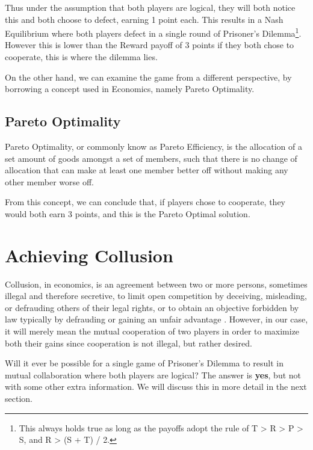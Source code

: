 \documentclass{icldt}
\numberwithin{equation}{section}       %
\begin{document}
Thus under the assumption that both players are logical, they will both notice this and both choose to defect, earning 1 point each. This results in a Nash Equilibrium where both players defect in a single round of Prisoner's Dilemma\footnote{This always holds true as long as the payoffs adopt the rule of T > R > P > S, and R > (S + T) / 2.}. However this is lower than the Reward payoff of 3 points if they both chose to cooperate, this is where the dilemma lies. \cite{nash94}

On the other hand, we can examine the game from a different perspective, by borrowing a concept used in Economics, namely Pareto Optimality.

\subsection{Pareto Optimality}
Pareto Optimality, or commonly know as Pareto Efficiency, is the allocation of a set amount of goods amongst a set of members, such that there is no change of allocation that can make at least one member better off without making any other member worse off. \cite{fudenberg1993game}

From this concept, we can conclude that, if players chose to cooperate, they would both earn 3 points, and this is the Pareto Optimal solution. 
\section{Achieving Collusion} 
\label{sect:Achieving Collusion}
Collusion, in economics, is an agreement between two or more persons, sometimes illegal and therefore secretive, to limit open competition by deceiving, misleading, or defrauding others of their legal rights, or to obtain an objective forbidden by law typically by defrauding or gaining an unfair advantage \cite{sullivan2003economics}. However, in our case, it will merely mean the mutual cooperation of two players in order to maximize both their gains since cooperation is not illegal, but rather desired.

Will it ever be possible for a single game of Prisoner's Dilemma to result in mutual collaboration where both players are logical? The answer is \textbf{yes}, but not with some other extra information. We will discuss this in more detail in the next section.
\end{document}
